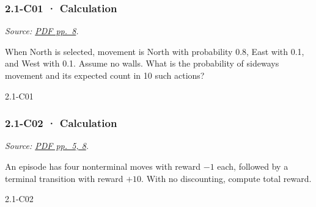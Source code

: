\noindent\begin{minipage}{\linewidth}

\subsubsection{2.1-C01 · Calculation}\label{c01-calculation-3}

\emph{Source:
\href{../Lecture\%20Slides/2.1.\%20Introduction\%20to\%20Reinforcement\%20Learning.pdf\#page=8}{PDF
pp.~8}.}

When North is selected, movement is North with probability 0.8, East
with 0.1, and West with 0.1. Assume no walls. What is the probability of
sideways movement and its expected count in 10 such actions?

\begin{solution}[26mm]{2.1-C01}

\end{solution}
\end{minipage}\par\medskip

\noindent\begin{minipage}{\linewidth}

\subsubsection{2.1-C02 · Calculation}\label{c02-calculation-3}

\emph{Source:
\href{../Lecture\%20Slides/2.1.\%20Introduction\%20to\%20Reinforcement\%20Learning.pdf\#page=5}{PDF
pp.~5, 8}.}

An episode has four nonterminal moves with reward \(-1\) each, followed
by a terminal transition with reward \(+10\). With no discounting,
compute total reward.

\begin{solution}[26mm]{2.1-C02}

\end{solution}
\end{minipage}\par\medskip

